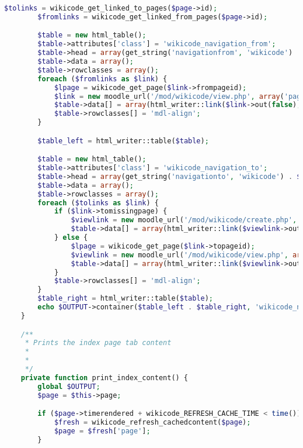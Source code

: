 \begin{lstlisting}[language=PHP]
        $tolinks = wikicode_get_linked_to_pages($page->id);
        $fromlinks = wikicode_get_linked_from_pages($page->id);

        $table = new html_table();
        $table->attributes['class'] = 'wikicode_navigation_from';
        $table->head = array(get_string('navigationfrom', 'wikicode') . $OUTPUT->help_icon('navigationfrom', 'wikicode') . ':');
        $table->data = array();
        $table->rowclasses = array();
        foreach ($fromlinks as $link) {
            $lpage = wikicode_get_page($link->frompageid);
            $link = new moodle_url('/mod/wikicode/view.php', array('pageid' => $lpage->id));
            $table->data[] = array(html_writer::link($link->out(false), format_string($lpage->title)));
            $table->rowclasses[] = 'mdl-align';
        }

        $table_left = html_writer::table($table);

        $table = new html_table();
        $table->attributes['class'] = 'wikicode_navigation_to';
        $table->head = array(get_string('navigationto', 'wikicode') . $OUTPUT->help_icon('navigationto', 'wikicode') . ':');
        $table->data = array();
        $table->rowclasses = array();
        foreach ($tolinks as $link) {
            if ($link->tomissingpage) {
                $viewlink = new moodle_url('/mod/wikicode/create.php', array('swid' => $page->subwikiid, 'title' => $link->tomissingpage, 'action' => 'new'));
                $table->data[] = array(html_writer::link($viewlink->out(false), format_string($link->tomissingpage), array('class' => 'wikicode_newentry')));
            } else {
                $lpage = wikicode_get_page($link->topageid);
                $viewlink = new moodle_url('/mod/wikicode/view.php', array('pageid' => $lpage->id));
                $table->data[] = array(html_writer::link($viewlink->out(false), format_string($lpage->title)));
            }
            $table->rowclasses[] = 'mdl-align';
        }
        $table_right = html_writer::table($table);
        echo $OUTPUT->container($table_left . $table_right, 'wikicode_navigation_container');
    }

    /**
     * Prints the index page tab content
     *
     *
     */
    private function print_index_content() {
        global $OUTPUT;
        $page = $this->page;

        if ($page->timerendered + wikicode_REFRESH_CACHE_TIME < time()) {
            $fresh = wikicode_refresh_cachedcontent($page);
            $page = $fresh['page'];
        }


\end{lstlisting}
